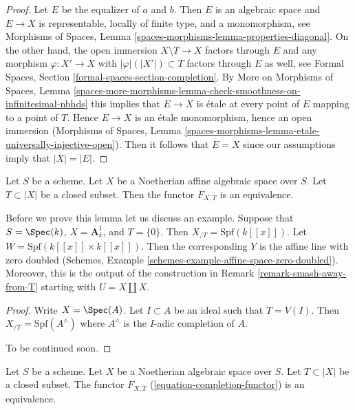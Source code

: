 \begin{proof}
Let $E$ be the equalizer of $a$ and $b$. Then $E$ is an algebraic space
and $E \to X$ is representable, locally of finite type, and a monomorphism, see
Morphisms of Spaces, Lemma \ref{spaces-morphisms-lemma-properties-diagonal}.
On the other hand, the open immersion $X \setminus T \to X$
factors through $E$ and any morphism $\varphi : X' \to X$ with
$|\varphi|(|X'|) \subset T$ factors through $E$ as well, see
Formal Spaces, Section \ref{formal-spaces-section-completion}.
By More on Morphisms of Spaces, Lemma
\ref{spaces-more-morphisms-lemma-check-smoothness-on-infinitesimal-nbhds}
this implies that $E \to X$ is \'etale at every point of $E$
mapping to a point of $T$. Hence $E \to X$ is an \'etale
monomorphism, hence an open immersion
(Morphisms of Spaces, Lemma
\ref{spaces-morphisms-lemma-etale-universally-injective-open}).
Then it follows that $E = X$ since our assumptions imply that $|X| = |E|$.
\end{proof}

\begin{lemma}
\label{lemma-dilatations-affine}
Let $S$ be a scheme. Let $X$ be a Noetherian affine algebraic space over $S$.
Let $T \subset |X|$ be a closed subset. Then the functor $F_{X, T}$ is an
equivalence.
\end{lemma}

\noindent
Before we prove this lemma let us discuss an example. Suppose that
$S = \Spec(k)$, $X = \mathbf{A}^1_k$, and $T = \{0\}$. Then
$X_{/T} = \text{Spf}(k[[x]])$. Let $W = \text{Spf}(k[[x]] \times k[[x]])$.
Then the corresponding $Y$ is the affine line with zero doubled
(Schemes, Example \ref{schemes-example-affine-space-zero-doubled}).
Moreover, this is the output of the construction in
Remark \ref{remark-smash-away-from-T}
starting with $U = X \amalg X$.

\begin{proof}
Write $X = \Spec(A)$. Let $I \subset A$ be an ideal such that
$T = V(I)$. Then $X_{/T} = \text{Spf}(A^\wedge)$ where $A^\wedge$
is the $I$-adic completion of $A$.

\medskip\noindent
To be continued soon.
\end{proof}

\begin{theorem}
\label{theorem-dilatations-general}
Let $S$ be a scheme. Let $X$ be a Noetherian algebraic space over $S$.
Let $T \subset |X|$ be a closed subset. The functor $F_{X, T}$
(\ref{equation-completion-functor}) is an equivalence.
\end{theorem}

